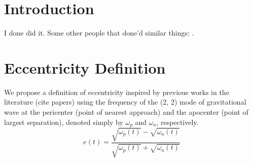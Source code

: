 \documentclass[aps,prd,amsmath,floats,floatfix, twocolumn,
superscriptaddress,nofootinbib,showpacs]{revtex4-1}
\begin{document}
\maketitle

\section{Introduction}
\label{sec:introduction}
I done did it. Some other people that done'd similar things:
\cite{Scott:2015rza}.

\section{Eccentricity Definition}
\label{sec:eccentricity_definition}
We propose a definition of eccentricity inspired by previous works in the literature (cite papers) using the frequency of the (2, 2) mode of gravitational wave at
the pericenter (point of nearest approach) and the apocenter (point of largest separation), denoted simply by $\omega_{p}$ and $\omega_{a}$, respectively.
\begin{equation}
\label{eq:eccentricity_definition}
e(t) = \frac{\sqrt{\omega_{p}(t)} - \sqrt{\omega_{a}(t)}}{\sqrt{\omega_{p}(t)} + \sqrt{\omega_{a}(t)}}
\end{equation}
\end{document}
